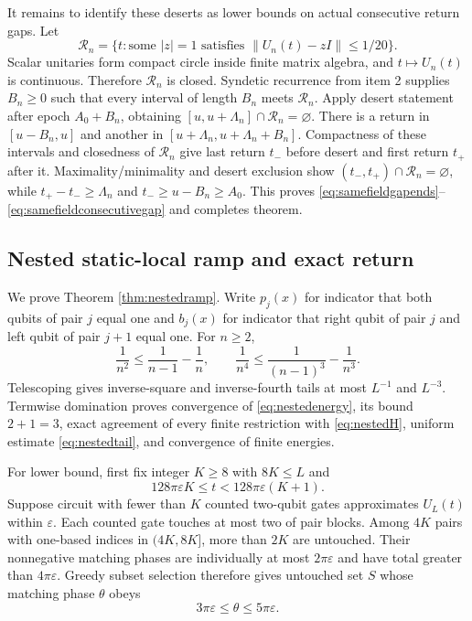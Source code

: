 It remains to identify these deserts as lower bounds on actual consecutive
return gaps.  Let
\begin{equation}
 \mathcal R_n=\{t:\text{some }|z|=1\text{ satisfies }
       \|U_n(t)-zI\|\le1/20\}.                       \label{eq:closedprojectivereturnset}
\end{equation}
Scalar unitaries form compact circle inside finite matrix algebra, and
$t\mapsto U_n(t)$ is continuous.  Therefore $\mathcal R_n$ is closed.
Syndetic recurrence from item 2 supplies $B_n\ge0$ such that every interval
of length $B_n$ meets $\mathcal R_n$.  Apply desert statement after epoch
$A_0+B_n$, obtaining $[u,u+\Lambda_n]\cap\mathcal R_n=\varnothing$.
There is a return in $[u-B_n,u]$ and another in
$[u+\Lambda_n,u+\Lambda_n+B_n]$.  Compactness of these intervals and
closedness of $\mathcal R_n$ give last return $t_-$ before desert and first
return $t_+$ after it.  Maximality/minimality and desert exclusion show
$(t_-,t_+)\cap\mathcal R_n=\varnothing$, while
$t_+-t_-\ge\Lambda_n$ and $t_-\ge u-B_n\ge A_0$.  This proves
\eqref{eq:samefieldgapends}--\eqref{eq:samefieldconsecutivegap} and completes
theorem.

\subsection{Nested static-local ramp and exact return}

We prove Theorem \ref{thm:nestedramp}.  Write $p_j(x)$ for indicator that
both qubits of pair $j$ equal one and $b_j(x)$ for indicator that right qubit
of pair $j$ and left qubit of pair $j+1$ equal one.  For $n\ge2$,
\begin{equation}
 \frac1{n^2}\le\frac1{n-1}-\frac1n,
 \qquad
 \frac1{n^4}\le\frac1{(n-1)^3}-\frac1{n^3}.          \label{eq:nestedtelescopes}
\end{equation}
Telescoping gives inverse-square and inverse-fourth tails at most $L^{-1}$
and $L^{-3}$.  Termwise domination proves convergence of
\eqref{eq:nestedenergy}, its bound $2+1=3$, exact agreement of every finite
restriction with \eqref{eq:nestedH}, uniform estimate
\eqref{eq:nestedtail}, and convergence of finite energies.

For lower bound, first fix integer $K\ge8$ with $8K\le L$ and
\begin{equation}
 128\pi\varepsilon K\le t
 <128\pi\varepsilon(K+1).                            \label{eq:nestedKwindow}
\end{equation}
Suppose circuit with fewer than $K$ counted two-qubit gates approximates
$U_L(t)$ within $\varepsilon$.  Each counted gate touches at most two of
pair blocks.  Among $4K$ pairs with one-based indices in $(4K,8K]$, more
than $2K$ are untouched.  Their nonnegative matching phases are individually
at most $2\pi\varepsilon$ and have total greater than
$4\pi\varepsilon$.  Greedy subset selection therefore gives untouched set
$S$ whose matching phase $\theta$ obeys
\begin{equation}
 3\pi\varepsilon\le\theta\le5\pi\varepsilon.         \label{eq:nestedtheta}
\end{equation}

